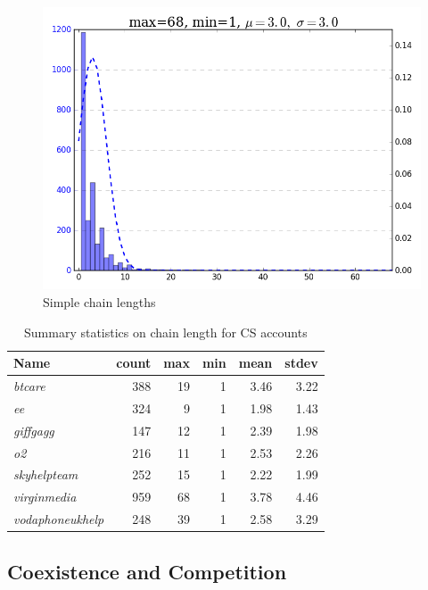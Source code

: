 \documentclass[sigconf]{acmart}
\begin{document}
\begin{figure}[htb]
\centering
\includegraphics[width=\columnwidth]{images/simplechainlengths.png}
\caption{Simple chain lengths}
\label{fig:simplechainlengths}
\end{figure}

\begin{table}[!h]
\centering
\begin{tabularx}{\columnwidth}{lrrrrr}
\toprule
\textbf{Name} & \textbf{count} & \textbf{max} & \textbf{min} & \textbf{mean} & \textbf{stdev}\\ 
\midrule
{\emph{btcare}} & 388 & 19 & 1 & 3.46 & 3.22\\
{\emph{ee}} & 324 & 9 & 1 & 1.98 & 1.43\\
{\emph{giffgagg}} & 147 & 12 & 1 & 2.39 & 1.98\\ 
{\emph{o2}} & 216 & 11 & 1 & 2.53 & 2.26\\
{\emph{skyhelpteam}} & 252 & 15 & 1 & 2.22 & 1.99\\
{\emph{virginmedia}} & 959 & 68 & 1 & 3.78 & 4.46\\
{\emph{vodaphoneukhelp}} & 248 & 39 & 1 & 2.58 & 3.29\\
\bottomrule
\end{tabularx}
\caption{Summary statistics on chain length for CS accounts}
\label{tbl:delaystatscl}
\end{table}

\subsection{Coexistence and Competition}
\end{document}
